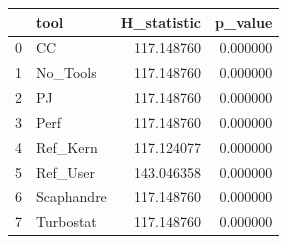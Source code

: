 \begin{tabular}{llrr}
\toprule
 & tool & H_statistic & p_value \\
\midrule
0 & CC & 117.148760 & 0.000000 \\
1 & No_Tools & 117.148760 & 0.000000 \\
2 & PJ & 117.148760 & 0.000000 \\
3 & Perf & 117.148760 & 0.000000 \\
4 & Ref_Kern & 117.124077 & 0.000000 \\
5 & Ref_User & 143.046358 & 0.000000 \\
6 & Scaphandre & 117.148760 & 0.000000 \\
7 & Turbostat & 117.148760 & 0.000000 \\
\bottomrule
\end{tabular}
